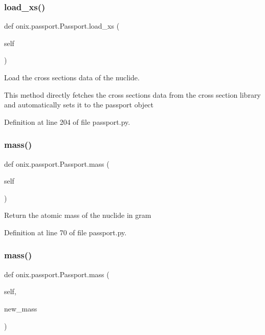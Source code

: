 \subsubsection{\texorpdfstring{load\+\_\+xs()}{load\_xs()}}
{\footnotesize\ttfamily def onix.\+passport.\+Passport.\+load\+\_\+xs (\begin{DoxyParamCaption}\item[{}]{self }\end{DoxyParamCaption})}

\begin{DoxyVerb}Load the cross sections data of the nuclide.

This method directly fetches the cross sections data from the cross section library and automatically sets
it to the passport object\end{DoxyVerb}
 

Definition at line 204 of file passport.\+py.

\mbox{\label{classonix_1_1passport_1_1Passport_aeaf86019a32f85ceb44fe3b03d616698}} 
\subsubsection{\texorpdfstring{mass()}{mass()}\hspace{0.1cm}{\footnotesize\ttfamily [1/2]}}
{\footnotesize\ttfamily def onix.\+passport.\+Passport.\+mass (\begin{DoxyParamCaption}\item[{}]{self }\end{DoxyParamCaption})}

\begin{DoxyVerb}Return the atomic mass of the nuclide in gram\end{DoxyVerb}
 

Definition at line 70 of file passport.\+py.

\mbox{\label{classonix_1_1passport_1_1Passport_a692af8e5326c8550dde51fd843aaa033}} 
\subsubsection{\texorpdfstring{mass()}{mass()}\hspace{0.1cm}{\footnotesize\ttfamily [2/2]}}
{\footnotesize\ttfamily def onix.\+passport.\+Passport.\+mass (\begin{DoxyParamCaption}\item[{}]{self,  }\item[{}]{new\+\_\+mass }\end{DoxyParamCaption})}

